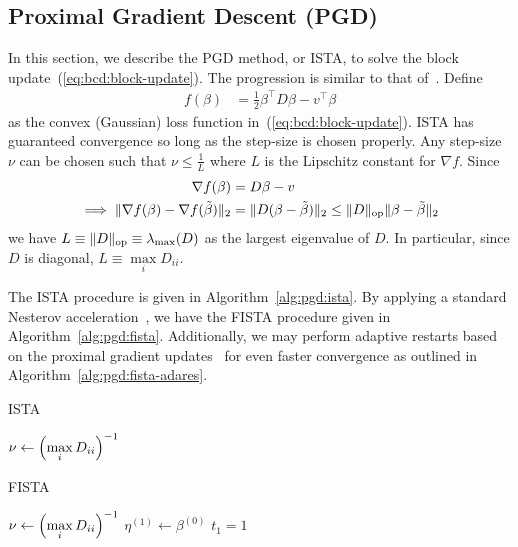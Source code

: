 \subsection{Proximal Gradient Descent (PGD)}\label{ssec:pgd}

In this section, we describe the PGD method, or ISTA,
to solve the block update~(\ref{eq:bcd:block-update}).
The progression is similar to that of~\citet{sls:2016}.
Define
\begin{align*}
    f(\beta)
    &=
    \frac{1}{2} \beta^\top D \beta
    - v^\top \beta
\end{align*}
as the convex (Gaussian) loss function in~(\ref{eq:bcd:block-update}).
ISTA has guaranteed convergence so long as the step-size is chosen properly.
Any step-size $\nu$ can be chosen such that
$\nu \leq \frac{1}{L}$ where $L$ is the Lipschitz constant for $\nabla f$.
Since 
\begin{align*}
    \nabla f(\beta)
    &=
    D \beta - v
    \\\implies
    \|
        \nabla f(\beta)
        - \nabla f(\tilde{\beta})
    \|_2
    &=
    \|D (\beta - \tilde{\beta})\|_2
    \leq
    \|D\|_{\text{op}} \|\beta-\tilde{\beta}\|_2
\end{align*}
we have $L \equiv \|D\|_{\text{op}} \equiv \lambda_{\max}(D)$ as the largest eigenvalue of $D$.
In particular, since $D$ is diagonal, $L \equiv \max\limits_{i} D_{ii}$.

The ISTA procedure is given in Algorithm~\ref{alg:pgd:ista}.
By applying a standard Nesterov acceleration~\citep{beck:2009}, 
we have the FISTA procedure given in Algorithm~\ref{alg:pgd:fista}.
Additionally, we may perform adaptive restarts
based on the proximal gradient updates~\citep{odonoghue:2015}
for even faster convergence as outlined in Algorithm~\ref{alg:pgd:fista-adares}.

\begin{algorithm}
    \caption{ISTA}\label{alg:pgd:ista}
    $\nu \gets \left(\max\limits_{i} D_{ii}\right)^{-1}$\;
\end{algorithm}

\begin{algorithm}
    \caption{FISTA}\label{alg:pgd:fista}
    $\nu \gets \left(\max\limits_{i} D_{ii}\right)^{-1}$\;
    $\eta^{(1)} \gets \beta^{(0)}$\;
    $t_1 = 1$\;
\end{algorithm}

